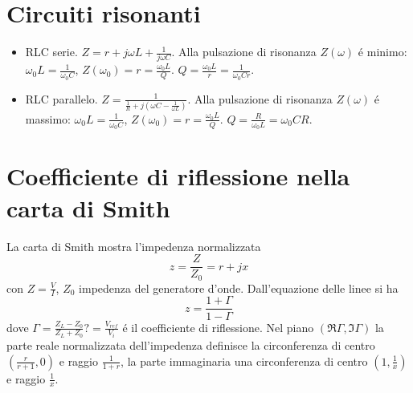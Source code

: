 \documentclass[main.tex]{subfiles}
\begin{document}

\section{Circuiti risonanti}
\begin{itemize}
\item RLC serie. $Z=r+j\omega L+\frac{1}{j\omega C}$. Alla pulsazione di risonanza $Z(\omega)$ \'e minimo: $\omega_0L=\frac{1}{\omega_0C}$, $Z(\omega_0)=r=\frac{\omega_0L}{Q}$. $Q=\frac{\omega_0L}{r}=\frac{1}{\omega_0Cr}$.
\item RLC parallelo. $Z=\frac{1}{\frac{1}{R}+j(\omega C-\frac{1}{\omega L})}$. Alla pulsazione di risonanza $Z(\omega)$ \'e massimo: $\omega_0L=\frac{1}{\omega_0C}$, $Z(\omega_0)=r=\frac{\omega_0L}{Q}$. $Q=\frac{R}{\omega_0L}=\omega_0CR$.
\end{itemize}

\section{Coefficiente di riflessione nella carta di Smith}
La carta di Smith mostra l'impedenza normalizzata
\begin{equation}
z=\frac{Z}{Z_0}=r+jx
\end{equation}
con $Z=\frac{V}{I}$, $Z_0$ impedenza del generatore d'onde. Dall'equazione delle linee si ha
\begin{equation}
z=\frac{1+\Gamma}{1-\Gamma}
\end{equation}
dove $\Gamma=\frac{Z_L-Z_0}{Z_L+Z_0}?=\frac{V_{ref}}{V_i}$ \'e il coefficiente di riflessione.
Nel piano $(\Re{\Gamma},\Im{\Gamma})$ la parte reale normalizzata dell'impedenza definisce la circonferenza di centro $(\frac{r}{r+1},0)$ e raggio $\frac{1}{1+r}$, la parte immaginaria una circonferenza di centro $(1,\frac{1}{x})$ e raggio $\frac{1}{x}$.

\end{document}
